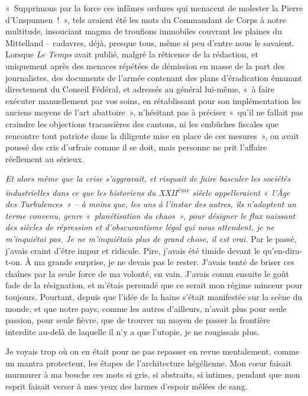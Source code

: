\documentclass[
  extrafontsizes,
  oneside,
  14pt
]{memoir}
\begin{document}
«~Supprimons par la force ces infâmes ordures qui menacent de molester la
Pierre d'Unspunnen~!~», tels avaient été les mots du Commandant de Corps à
notre multitude, insouciant magma de troufions immobiles couvrant les plaines
du Mittelland -- cadavres, déjà, presque tous, même si peu d'entre nous le
savaient. Lorsque \emph{Le Temps} avait publié, malgré la réticence de la
rédaction, et uniquement après des menaces répétées de démission en masse de la
part des journalistes, des documents de l'armée contenant des plans
d'éradication émanant directement du Conseil Fédéral, et adressés au général
lui-même, «~à faire exécuter manuellement par vos soins, en rétablissant pour
son implémentation les anciens moyens de l'art abattoire~», n'hésitant pas à
préciser «~qu'il ne fallait pas craindre les objections tracassières des
cantons, ni les embûches fiscales que rencontre tout patriote dans la diligente
mise en place de ces mesures~», on avait poussé des cris d'orfraie comme il se
doit, mais personne ne prit l'affaire réellement au sérieux.

\emph{Et alors même que la crise s'aggravait, et risquait de faire
basculer les sociétés industrielles dans ce que les historiens du
XXII\textsuperscript{ème} siècle appelleraient «~l'Âge des Turbulences~» -- à
moins que, les uns à l'instar des autres, ils n'adoptent un terme convenu,
genre «~planétisation du chaos~», pour désigner le flux naissant des siècles de
répression et d'obscurantisme légal qui nous attendent, je ne m'inquiétai pas.
Je ne m'inquiétais plus de grand chose, il est vrai.} Par le passé, j'avais
craint d'être impur et ridicule. Pire, j'avais été timide devant le
qu'en-dira-t-on. À ma grande surprise, je ne devais pas le rester. J'avais
tenté de briser ces chaînes par la seule force de ma volonté, en vain. J'avais
connu ensuite le goût fade de la résignation, et m'étais persuadé que ce serait
mon régime minceur pour toujours. Pourtant, depuis que l'idée de la haine
s'était manifestée sur la scène du monde, et que notre pays, comme les autres
d'ailleurs, n'avait plus pour seule passion, pour seule fièvre, que de trouver
un moyen de passer la frontière interdite au-delà de laquelle il n'y a que
l'utopie, je ne rougissais plus.

Je voyais trop où on en était pour ne pas repasser en revue mentalement, comme
un mantra protecteur, les étapes de l'architecture hégélienne. Mon cœur faisait
murmurer à ma bouche ces mots si gris, si abstraits, si intimes, pendant que
mon esprit faisait verser à mes yeux des larmes d'espoir mêlées de sang.
\end{document}
